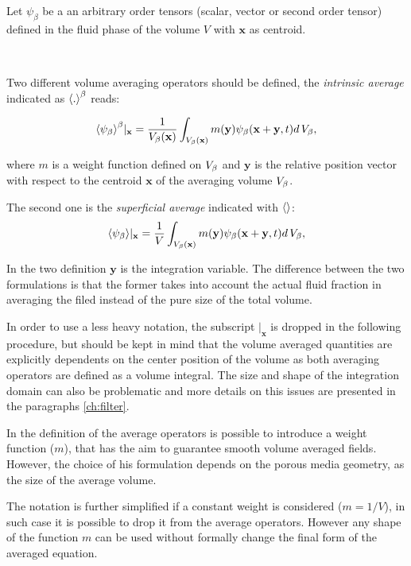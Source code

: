 Let $\psi_{\beta}$ be a an arbitrary order tensors (scalar, vector or second order tensor) defined in the fluid phase of the volume $V$ with $\mathbf{x}$ as centroid.

\newpage 

$\quad$

\newpage

Two different volume averaging operators should be defined, the \textit{intrinsic average} indicated as ${\left< . \right>}^{\beta}$ reads:

\begin{equation}
	{\left< \psi_{\beta} \right>}^{\beta}|_{\mathbf{x}} = \dfrac{1}{V_\beta(\mathbf{x})} \int_{V_\beta(\mathbf{x})}  m(\mathbf{y}) \psi_{\beta}(\mathbf{x}+\mathbf{y}, t) d \, V_\beta,
	\label{eq:avg_intrinsic}
\end{equation}

where $m$ is a weight function defined on $V_\beta$ and $\mathbf{y}$ is the relative position vector with respect to the centroid $\mathbf{x}$ of the averaging volume $V_\beta$.

The second one is the \textit{superficial average} indicated with ${\left<  \right>}$:
\begin{equation}
	{\left< \psi_{\beta} \right>}|_{\mathbf{x}} = \dfrac{1}{V} \int_{V_\beta(\mathbf{x})} m(\mathbf{y}) \psi_{\beta}(\mathbf{x}+\mathbf{y}, t) d \, V_\beta,
	\label{eq:avg_superficial}
\end{equation}

In the two definition $\mathbf{y}$ is the integration variable.
The difference between the two formulations is that the former takes into account the actual fluid fraction in averaging the filed instead of the pure size of the total volume.

In order to use a less heavy notation, the subscript $|_{\mathbf{x}}$ is dropped in the following procedure, but should be kept in mind that the volume averaged quantities are explicitly dependents on the center position of the volume as both averaging operators are defined as a volume integral.
The size and shape of the integration domain can also be problematic and more details on this issues are presented in the paragraphs \ref{ch:filter}.

In the definition of the average operators is possible to introduce a weight function ($m$), that has the aim to guarantee smooth volume averaged fields.
However, the choice of his formulation depends on the porous media geometry, as the size of the average volume.

The notation is further simplified if a constant weight is considered ($m=1/V$), in such case it is possible to drop it from the average operators.
However any shape of the function $m$ can be used without formally change the final form of the averaged equation.

